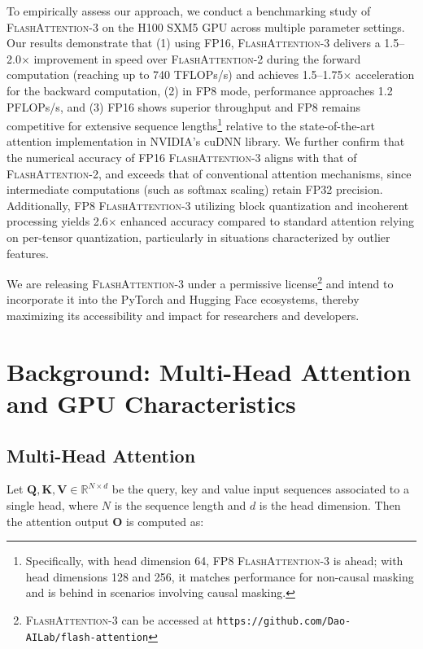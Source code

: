 To empirically assess our approach, we conduct a benchmarking study of \textsc{FlashAttention-3} on the H100 SXM5 GPU across multiple parameter settings. Our results demonstrate that (1) using FP16, \textsc{FlashAttention-3} delivers a 1.5--2.0$\times$ improvement in speed over \textsc{FlashAttention-2} during the forward computation (reaching up to 740 TFLOPs/s) and achieves 1.5--1.75$\times$ acceleration for the backward computation, (2) in FP8 mode, performance approaches 1.2 PFLOPs/s, and (3) FP16 shows superior throughput and FP8 remains competitive for extensive sequence lengths\footnote{Specifically, with head dimension 64, FP8 \textsc{FlashAttention-3} is ahead; with head dimensions 128 and 256, it matches performance for non-causal masking and is behind in scenarios involving causal masking.} relative to the state-of-the-art attention implementation in NVIDIA’s cuDNN library. We further confirm that the numerical accuracy of FP16 \textsc{FlashAttention-3} aligns with that of \textsc{FlashAttention-2}, and exceeds that of conventional attention mechanisms, since intermediate computations (such as softmax scaling) retain FP32 precision. Additionally, FP8 \textsc{FlashAttention-3} utilizing block quantization and incoherent processing yields 2.6$\times$ enhanced accuracy compared to standard attention relying on per-tensor quantization, particularly in situations characterized by outlier features.

We are releasing \textsc{FlashAttention-3} under a permissive license\footnote{\textsc{FlashAttention-3} can be accessed at \texttt{https://github.com/Dao-AILab/flash-attention}} and intend to incorporate it into the PyTorch and Hugging Face ecosystems, thereby maximizing its accessibility and impact for researchers and developers.

\section{Background: Multi-Head Attention and GPU Characteristics}
\label{sec:background}

\subsection{Multi-Head Attention}
\label{subsec:multi_head_attn}

Let $\mathbf{Q}, \mathbf{K}, \mathbf{V} \in \mathbb{R}^{N \times d}$ be the query, key and value input sequences associated to a single head, where $N$ is the sequence length and $d$ is the head dimension. Then the attention output $\mathbf{O}$ is computed as:

